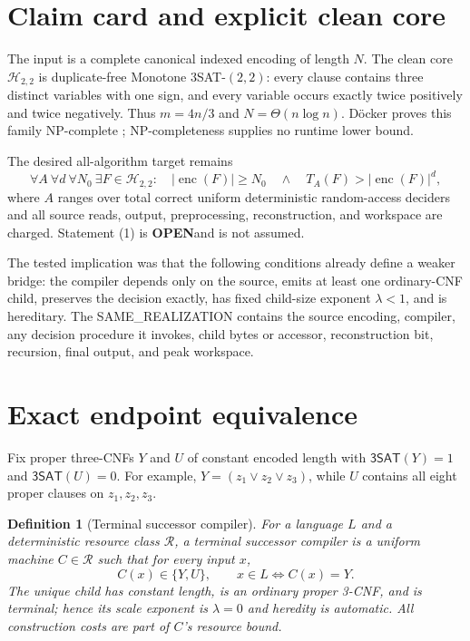 \documentclass[11pt]{article}
\newtheorem{definition}{Definition}
\newcommand{\SAT}{\mathsf{3SAT}}
\newcommand{\Htwo}{\mathcal H_{2,2}}
\newcommand{\OPEN}{\textbf{OPEN}}
\begin{document}
\section{Claim card and explicit clean core}

The input is a complete canonical indexed encoding of length $N$.  The clean
core $\Htwo$ is duplicate-free Monotone $3$SAT-$(2,2)$: every clause contains
three distinct variables with one sign, and every variable occurs exactly
twice positively and twice negatively.  Thus $m=4n/3$ and
$N=\Theta(n\log n)$.  D\"ocker proves this family NP-complete
\cite{doecker}; NP-completeness supplies no runtime lower bound.

The desired all-algorithm target remains
\[
 \forall A\ \forall d\ \forall N_0\ \exists F\in\Htwo:\quad
 |\operatorname{enc}(F)|\ge N_0
 \quad\land\quad T_A(F)>|\operatorname{enc}(F)|^d,       \tag{1}
\]
where $A$ ranges over total correct uniform deterministic random-access
deciders and all source reads, output, preprocessing, reconstruction, and
workspace are charged.  Statement (1) is \OPEN and is not assumed.

The tested implication was that the following conditions already define a
weaker bridge: the compiler depends only on the source, emits at least one
ordinary-CNF child, preserves the decision exactly, has fixed child-size
exponent $\lambda<1$, and is hereditary.  The SAME\_REALIZATION contains the
source encoding, compiler, any decision procedure it invokes, child bytes or
accessor, reconstruction bit, recursion, final output, and peak workspace.

\section{Exact endpoint equivalence}

Fix proper three-CNFs $Y$ and $U$ of constant encoded length with
$\SAT(Y)=1$ and $\SAT(U)=0$.  For example, $Y=(z_1\vee z_2\vee z_3)$,
while $U$ contains all eight proper clauses on $z_1,z_2,z_3$.

\begin{definition}[Terminal successor compiler]
For a language $L$ and a deterministic resource class $\mathcal R$, a
terminal successor compiler is a uniform machine $C\in\mathcal R$ such that
for every input $x$,
\[
 C(x)\in\{Y,U\},\qquad x\in L\iff C(x)=Y.              \tag{2}
\]
The unique child has constant length, is an ordinary proper 3-CNF, and is
terminal; hence its scale exponent is $\lambda=0$ and heredity is automatic.
All construction costs are part of $C$'s resource bound.
\end{definition}
\end{document}
